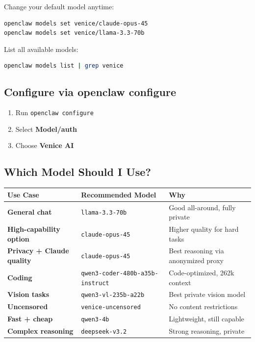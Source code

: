 Change your default model anytime:

\begin{lstlisting}[language=bash]
openclaw models set venice/claude-opus-45
openclaw models set venice/llama-3.3-70b
\end{lstlisting}


List all available models:

\begin{lstlisting}[language=bash]
openclaw models list | grep venice
\end{lstlisting}


\subsection{Configure via openclaw configure}


\begin{enumerate}
  \item Run \texttt{openclaw configure}
  \item Select \textbf{Model/auth}
  \item Choose \textbf{Venice AI}
\end{enumerate}


\subsection{Which Model Should I Use?}



\begin{table}[h]
\centering
\small
\begin{tabular}{|l|l|l|}
\hline
Use Case & Recommended Model & Why \\
\hline
\textbf{General chat} & \texttt{llama-3.3-70b} & Good all-around, fully private \\
\hline
\textbf{High-capability option} & \texttt{claude-opus-45} & Higher quality for hard tasks \\
\hline
\textbf{Privacy + Claude quality} & \texttt{claude-opus-45} & Best reasoning via anonymized proxy \\
\hline
\textbf{Coding} & \texttt{qwen3-coder-480b-a35b-instruct} & Code-optimized, 262k context \\
\hline
\textbf{Vision tasks} & \texttt{qwen3-vl-235b-a22b} & Best private vision model \\
\hline
\textbf{Uncensored} & \texttt{venice-uncensored} & No content restrictions \\
\hline
\textbf{Fast + cheap} & \texttt{qwen3-4b} & Lightweight, still capable \\
\hline
\textbf{Complex reasoning} & \texttt{deepseek-v3.2} & Strong reasoning, private \\
\hline
\end{tabular}
\end{table}



